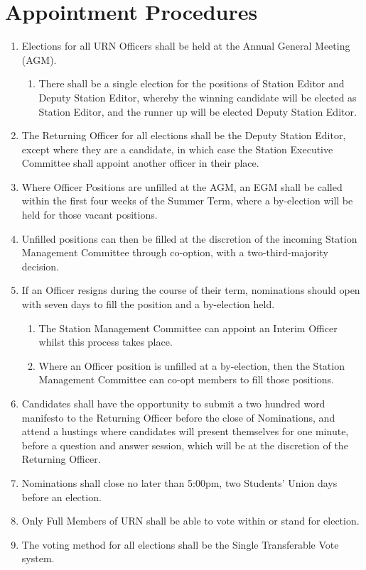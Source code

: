 \section{Appointment Procedures}

\begin{enumerate}[label*=\thesection.\arabic*.]
    \item Elections for all URN Officers shall be held at the Annual General Meeting (AGM).
          \begin{enumerate}[label*=\arabic*.]
              \item There shall be a single election for the positions of Station Editor and Deputy Station Editor, whereby the winning candidate will be elected as Station Editor, and the runner up will be elected Deputy Station Editor.
          \end{enumerate}
    \item The Returning Officer for all elections shall be the Deputy Station Editor, except where they are a candidate, in which case the Station Executive Committee shall appoint another officer in their place.
    \item Where Officer Positions are unfilled at the AGM, an EGM shall be called within the first four weeks of the Summer Term, where a by-election will be held for those vacant positions.
    \item Unfilled positions can then be filled at the discretion of the incoming Station Management Committee through co-option, with a two-third-majority decision.
    \item If an Officer resigns during the course of their term, nominations should open with seven days to fill the position and a by-election held.
          \begin{enumerate}[label*=\arabic*.]
              \item The Station Management Committee can appoint an Interim Officer whilst this process takes place.
              \item Where an Officer position is unfilled at a by-election, then the Station Management Committee can co-opt members to fill those positions.
          \end{enumerate}
    \item Candidates shall have the opportunity to submit a two hundred word manifesto to the Returning Officer before the close of Nominations, and attend a hustings where candidates will present themselves for one minute, before a question and answer session, which will be at the discretion of the Returning Officer.
    \item Nominations shall close no later than 5:00pm, two Students' Union days before an election.
    \item Only Full Members of URN shall be able to vote within or stand for election.
    \item The voting method for all elections shall be the Single Transferable Vote system.
\end{enumerate}
